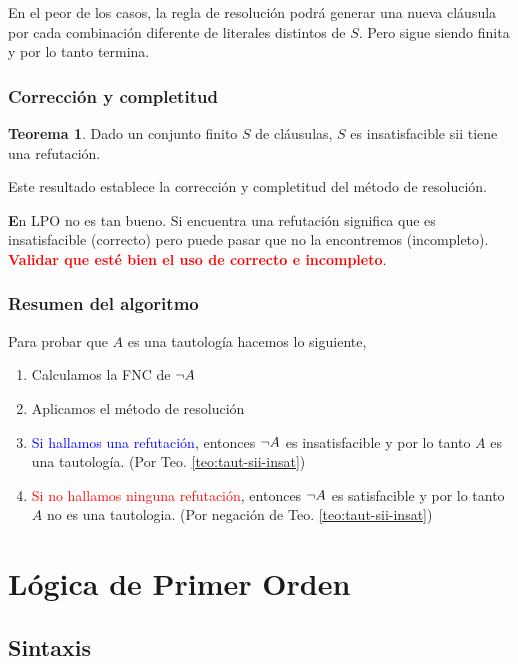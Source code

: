 \documentclass{report}
\theoremstyle{definition} %
\newtheorem{theorem}{Teorema}[chapter]
\newenvironment{nota}[1]
    {\begin{leftbar}\textbf{#1}}
    {\end{leftbar}}
\newcommand{\todo}[1]{{\textcolor{red}{\textbf{#1}}}}
\newcommand{\changed}[1]{\textcolor{Red}{#1}}
\newcommand{\select}[1]{\textcolor{Blue}{#1}}
\begin{document}
En el peor de los casos, la regla de resolución podrá generar una nueva cláusula
por cada combinación diferente de literales distintos de $S$. Pero sigue siendo
finita y por lo tanto termina.

\subsubsection{Corrección y completitud}

\begin{theorem}
    Dado un conjunto finito $S$ de cláusulas, $S$ es insatisfacible sii tiene
    una refutación.
\end{theorem}

Este resultado establece la corrección y completitud del método de resolución.

\begin{nota}
    En LPO no es tan bueno. Si encuentra una refutación significa que es
    insatisfacible (correcto) pero puede pasar que no la encontremos
    (incompleto).
    \todo{Validar que esté bien el uso de correcto e incompleto}.
\end{nota}

\subsubsection{Resumen del algoritmo}

Para probar que $A$ es una tautología hacemos lo siguiente,

\begin{enumerate}
    \item Calculamos la FNC de $\neg A$
    \item Aplicamos el método de resolución
    \item \select{Si hallamos una refutación}, entonces $\neg A$ es
    insatisfacible y por lo tanto $A$ es una tautología. (Por Teo.
    \ref{teo:taut-sii-insat})
    \item \changed{Si no hallamos ninguna refutación}, entonces $\neg A$ es
    satisfacible y por lo tanto $A$ no es una tautologia. (Por negación de Teo.
    \ref{teo:taut-sii-insat})
\end{enumerate}

\section{Lógica de Primer Orden}

\subsection{Sintaxis}
\end{document}
